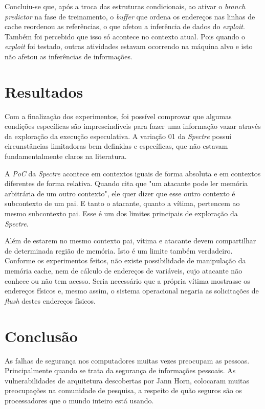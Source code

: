 \documentclass[conference]{IEEEtran}
\begin{document}
Concluiu-se que, após a troca das estruturas condicionais, ao ativar o \emph{branch predictor} na fase de treinamento, o \emph{buffer} que ordena os endereços nas linhas de cache reordenou as referências, o que afetou a inferência de dados do \emph{exploit}. Também foi percebido que isso só acontece no contexto atual. Pois quando o \emph{exploit} foi testado, outras atividades estavam ocorrendo na máquina alvo e isto não afetou as inferências de informações.

\section{Resultados}
Com a finalização dos experimentos, foi possível comprovar que algumas condições específicas são imprescindíveis para fazer uma informação vazar através da exploração da execução especulativa. A variação 01 da \emph{Spectre} possuí circunstâncias limitadoras bem definidas e específicas, que não estavam fundamentalmente claros na literatura.

A \emph{PoC} da \emph{Spectre} acontece em contextos iguais de forma absoluta e em contextos diferentes de forma relativa. Quando  cita que "um atacante pode ler memória arbitrária de um outro contexto", ele quer dizer que esse outro contexto é subcontexto de um pai. E tanto o atacante, quanto a vítima, pertencem ao mesmo subcontexto pai. Esse é um dos limites principais de exploração da \emph{Spectre}.

Além de estarem no mesmo contexto pai, vítima e atacante devem compartilhar de determinada região de memória. Isto é um limite também verdadeiro. Conforme os experimentos feitos, não existe possibilidade de manipulação da memória cache, nem de cálculo de endereços de variáveis, cujo atacante não conhece ou não tem acesso. Seria necessário que a própria vítima mostrasse os endereços físicos e, mesmo assim, o sistema operacional negaria as solicitações de \emph{flush} destes endereços físicos.

\section{Conclusão}
As falhas de segurança nos computadores muitas vezes preocupam as pessoas. Principalmente quando se trata da segurança de informações pessoais. As vulnerabilidades de arquitetura descobertas por Jann Horn, colocaram muitas preocupações na comunidade de pesquisa, a respeito de quão seguros são os processadores que o mundo inteiro está usando.
\end{document}
